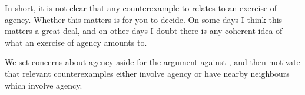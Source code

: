 \begin{note}
  In short, it is not clear that any counterexample to \issueInclusion{} relates to an exercise of agency.
  Whether this matters is for you to decide.
  On some days I think this matters a great deal, and on other days I doubt there is any coherent idea of what an exercise of agency amounts to.

  We set concerns about agency aside for the argument against \issueInclusion{}, and then motivate that relevant counterexamples either involve agency or have nearby neighbours which involve agency.
\end{note}






